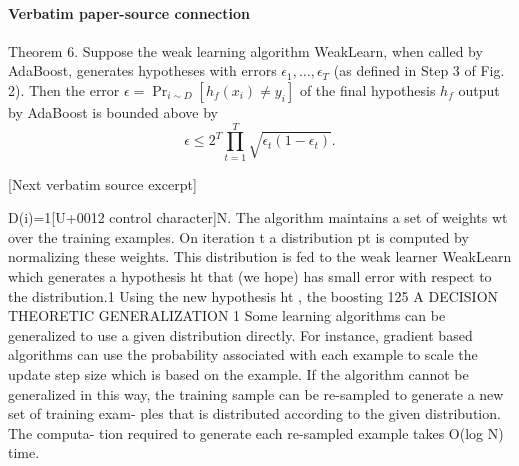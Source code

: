 \documentclass[10pt]{article}
\begin{document}
\paragraph{Verbatim paper-source connection}
\begin{ReviewVerbatim}
Theorem 6. Suppose the weak learning algorithm WeakLearn, when called by
AdaBoost, generates hypotheses with errors $\epsilon_1,\ldots,\epsilon_T$
(as defined in Step 3 of Fig. 2). Then the error
$\epsilon=\Pr_{i\sim D}[h_f(x_i)\neq y_i]$ of the final hypothesis $h_f$
output by AdaBoost is bounded above by
$$
\epsilon\leq 2^T\prod_{t=1}^T\sqrt{\epsilon_t(1-\epsilon_t)}. \tag{14}
$$

[Next verbatim source excerpt]

D(i)=1[U+0012 control character]N. The algorithm maintains a set of weights wt
over
the training examples. On iteration t a distribution pt
is
computed by normalizing these weights. This distribution is
fed to the weak learner WeakLearn which generates a
hypothesis ht that (we hope) has small error with respect to
the distribution.1
Using the new hypothesis ht , the boosting
125
A DECISION THEORETIC GENERALIZATION
1
Some learning algorithms can be generalized to use a given distribution
directly. For instance, gradient based algorithms can use the probability
associated with each example to scale the update step size which is based
on the example. If the algorithm cannot be generalized in this way, the
training sample can be re-sampled to generate a new set of training exam-
ples that is distributed according to the given distribution. The computa-
tion required to generate each re-sampled example takes O(log N) time.


\end{ReviewVerbatim}
\end{document}
